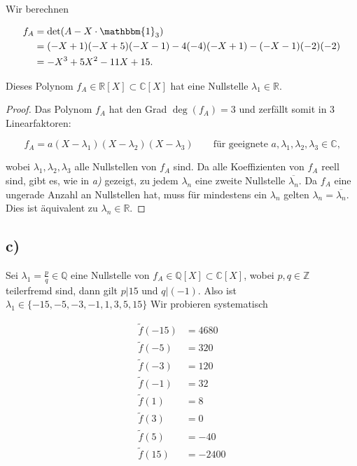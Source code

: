 \documentclass{article}
\newcommand{\ZZ}{\mathbb{Z}}
\newcommand{\QQ}{\mathbb{Q}}
\newcommand{\RR}{\mathbb{R}}
\newcommand{\CC}{\mathbb{C}}
\begin{document}
Wir berechnen

\[
\begin{aligned}
  f_A
  &=
  \det(A - X \cdot \mathbbm{1}_3 ) \\
  &=
  (-X+1)(-X+5)(-X-1)-4(-4)(-X+1)-(-X-1)(-2)(-2)\\
  &=
  -X^3+5X^2-11X+15.
\end{aligned}
\]

Dieses Polynom $f_A \in \RR[X] \subset \CC[X]$
hat eine Nullstelle $\lambda_1 \in \RR$.

\begin{proof}
  Das Polynom $f_A$ hat den Grad $\deg(f_A) = 3$
  und zerfällt somit in $3$ Linearfaktoren:

  \[
  f_A = a(X - \lambda_1)(X - \lambda_2)(X - \lambda_3) \qquad
  \text{für geeignete $a,\lambda_1,\lambda_2,\lambda_3 \in \CC$,}
  \]

  wobei $\lambda_1,\lambda_2,\lambda_3$
  alle Nullstellen von $f_A$ sind.
  Da alle Koeffizienten von $f_A$ reell sind, gibt es, wie in
  \textit{a)} gezeigt, zu jedem $\lambda_n$ eine
  zweite Nullstelle $\overline{\lambda_n}$.
  Da $f_A$ eine ungerade Anzahl an Nullstellen hat,
  muss für mindestens ein $\lambda_n$
  gelten $\lambda_n = \overline{\lambda_n}$.
  Dies ist äquivalent zu $\lambda_n \in \RR$.
\end{proof}

\newpage

\subsection*{c)}

Sei $\lambda_1 = \frac{p}{q} \in \QQ$ eine Nullstelle
von $f_A \in \QQ[X] \subset \CC[X]$, wobei $p,q \in \ZZ$
teilerfremd sind, 
dann gilt $p|15$ und $q|(-1)$.
Also ist $\lambda_1 \in \{ -15, -5, -3, -1, 1, 3, 5, 15 \}$
Wir probieren systematisch

\[
\begin{aligned}
  \tilde{f}(-15) &= 4680\\
  \tilde{f}(-5) &= 320\\
  \tilde{f}(-3) &= 120\\
  \tilde{f}(-1) &= 32\\
  \tilde{f}(1) &= 8\\
  \tilde{f}(3) &= 0\\
  \tilde{f}(5) &= -40\\
  \tilde{f}(15) &= -2400\\
\end{aligned}
\]
\end{document}

